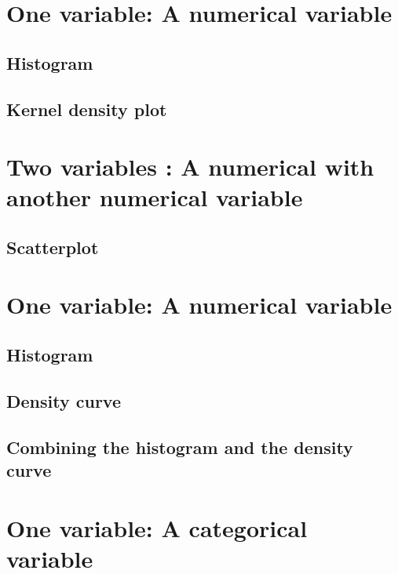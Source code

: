 \documentclass[]{book}
\theoremstyle{definition}
\theoremstyle{definition}
\theoremstyle{definition}
\theoremstyle{remark}
\begin{document}
\section{One variable: A numerical
variable}\label{one-variable-a-numerical-variable-1}

\subsection{Histogram}\label{histogram}

\subsection{Kernel density plot}\label{kernel-density-plot}

\section{Two variables : A numerical with another numerical
variable}\label{two-variables-a-numerical-with-another-numerical-variable-1}

\subsection{Scatterplot}\label{scatterplot}

\section{One variable: A numerical
variable}\label{one-variable-a-numerical-variable-2}

\subsection{Histogram}\label{histogram-1}

\subsection{Density curve}\label{density-curve}

\subsection{Combining the histogram and the density
curve}\label{combining-the-histogram-and-the-density-curve}

\section{One variable: A categorical
variable}\label{one-variable-a-categorical-variable-1}
\end{document}
